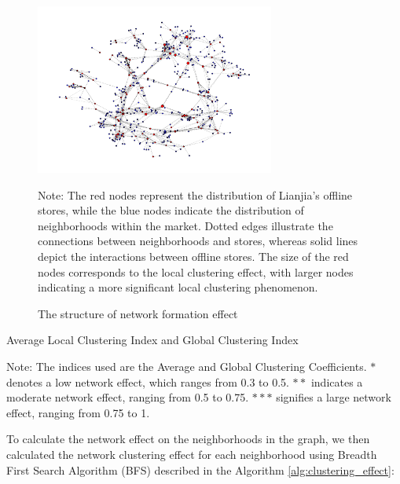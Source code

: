 \documentclass[11pt]{article}
\begin{document}
\begin{figure}
  \centering
  \includegraphics[width=0.7\textwidth]{../figures/network_formation_effect.pdf}
  \caption{The structure of network formation effect}
  \label{fig:network_formation_effect_graph}

  Note: The red nodes represent the distribution of Lianjia's offline stores, while the blue nodes indicate the distribution of neighborhoods within the market. Dotted edges illustrate the connections between neighborhoods and stores, whereas solid lines depict the interactions between offline stores. The size of the red nodes corresponds to the local clustering effect, with larger nodes indicating a more significant local clustering phenomenon.
\end{figure}

\begin{table}
  \begin{center}
    \begin{scriptsize}
      \caption{Average Local Clustering Index and Global Clustering Index}
      \label{tab:local_global_clustering_indices}
      

      Note: The indices used are the Average and Global Clustering Coefficients. $*$ denotes a low network effect, which ranges from 0.3 to 0.5. $**$ indicates a moderate network effect, ranging from 0.5 to 0.75. $***$ signifies a large network effect, ranging from 0.75 to 1.
    \end{scriptsize}
  \end{center}
\end{table}

To calculate the network effect on the neighborhoods in the graph, we then calculated the network clustering effect for each neighborhood using Breadth First Search Algorithm (BFS) described in the Algorithm \ref{alg:clustering_effect}:
\end{document}
